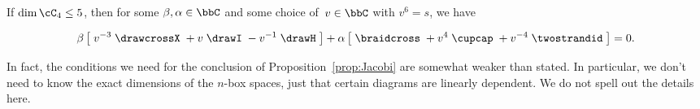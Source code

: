 \documentclass[12pt]{amsart}
\begin{document}
\begin{proposition}\label{prop:Jacobi}
If $\dim \cC_4 \leq 5$, then for some $\beta, \alpha \in \bbC$ and some choice
of~$v \in \bbC$ with $v^6 = s$, we have

\begin{equation}
\beta \left[\; v^{-3} \;
\drawcrossX
\;+ v \;
\drawI
\; -v^{-1} \;
 \drawH
\;\right]
 + \alpha
\left[\; \braidcross \;
 + v^{4}\;
\cupcap
\; + v^{-4} \;
 \twostrandid \;
 \right] = 0.\label{eq:quant-except-init}
 \end{equation}
\end{proposition}

In fact, the conditions we need for the conclusion of
Proposition~\ref{prop:Jacobi} are somewhat weaker than stated. In particular,
we don't need to know the exact dimensions of the $n$-box spaces, just that
certain diagrams are linearly dependent. We do not spell out the details here.
\end{document}
